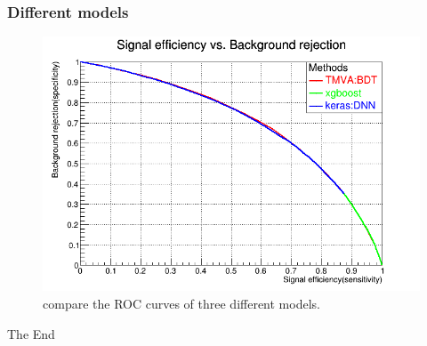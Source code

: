 \documentclass{beamer}
\begin{document}
\begin{frame}
\frametitle{Different models}
\begin{figure}
\includegraphics[scale=0.25]{./figures/tmva_xgboost.png}
\caption{compare the ROC curves of three different models.}
\end{figure}
\end{frame}







\begin{frame}
\Huge{\centerline{The End}}
\end{frame}

\end{document}
